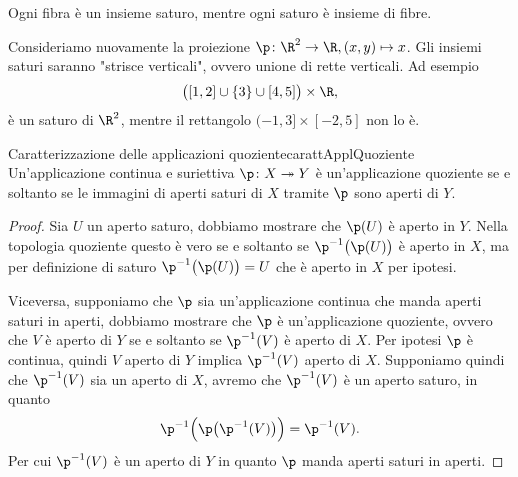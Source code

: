 \begin{oss}
	Ogni fibra è un insieme saturo, mentre ogni saturo è insieme di fibre.
\end{oss}

\begin{ese}
	Consideriamo nuovamente la proiezione \(\p\colon \R^2 \to \R, (x,y) \mapsto x\).
	Gli insiemi saturi saranno "strisce verticali", ovvero unione di rette verticali.
	Ad esempio
	\[
		\big([1,2] \cup \{3\} \cup [4,5]\big) \times \R,
	\]
	è un saturo di \(\R^2\), mentre il rettangolo \((-1,3] \times [-2,5]\) non lo è.
\end{ese}
%
%
\begin{prop}{Caratterizzazione delle applicazioni quoziente}{carattApplQuoziente}
	Un'applicazione continua e suriettiva \(\p\colon X \twoheadrightarrow Y\) è un'applicazione quoziente se e soltanto se le immagini di aperti saturi di \(X\) tramite \(\p\) sono aperti di \(Y\).
\end{prop}

\begin{proof}
	\graffito{\(\Rightarrow)\)}Sia \(U\) un aperto saturo, dobbiamo mostrare che \(\p(U)\) è aperto in \(Y\).
	Nella topologia quoziente questo è vero se e soltanto se \(\p^{-1}\big(\p(U)\big)\) è aperto in \(X\), ma per definizione di saturo \(\p^{-1}\big(\p(U)\big)=U\) che è aperto in \(X\) per ipotesi.

	\graffito{\(\Leftarrow)\)}Viceversa, supponiamo che \(\p\) sia un'applicazione continua che manda aperti saturi in aperti, dobbiamo mostrare che \(\p\) è un'applicazione quoziente, ovvero che \(V\) è aperto di \(Y\) se e soltanto se \(\p^{-1}(V)\) è aperto di \(X\).
	Per ipotesi \(\p\) è continua, quindi \(V\) aperto di \(Y\) implica \(\p^{-1}(V)\) aperto di \(X\).
	Supponiamo quindi che \(\p^{-1}(V)\) sia un aperto di \(X\), avremo che \(\p^{-1}(V)\) è un aperto saturo, in quanto
	\[
		\p^{-1}\Big(\p\big(\p^{-1}(V)\big)\Big)=\p^{-1}(V).
	\]
	Per cui \(\p^{-1}(V)\) è un aperto di \(Y\) in quanto \(\p\) manda aperti saturi in aperti.
\end{proof}

